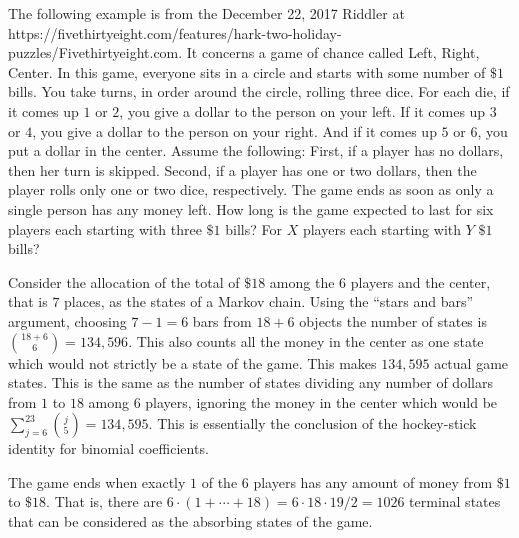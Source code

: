 \documentclass[12pt]{article}
\begin{document}
\begin{example}
    The following example is from the December 22, 2017 Riddler at \link
    {https://fivethirtyeight.com/features/hark-two-holiday-puzzles/}{Fivethirtyeight.com}.
    It concerns a game of chance called Left, Right, Center.  In this
    game, everyone sits in a circle and starts with some number of \( \$1
    \) bills.  You take turns, in order around the circle, rolling three
    dice.  For each die, if it comes up \( 1 \) or \( 2 \), you give a
    dollar to the person on your left.  If it comes up \( 3 \) or \( 4 \),
    you give a dollar to the person on your right.  And if it comes up \(
    5 \) or \( 6 \), you put a dollar in the center.  Assume the
    following:  First, if a player has no dollars, then her turn is
    skipped.  Second, if a player has one or two dollars, then the
    player rolls only one or two dice, respectively.  The game ends as
    soon as only a single person has any money left.  How long is the
    game expected to last for six players each starting with three \( \$1
    \) bills?  For \( X \) players each starting with \( Y \) \( \$1 \)
    bills?

    Consider the allocation of the total of \( \$18 \) among the \( 6 \)
    players and the center, that is \( 7 \) places, as the states of a
    Markov chain.  Using the ``stars and bars'' argument, choosing \(
    7-1 = 6 \) bars from \( 18 + 6 \) objects the number of states is \(
    \binom{18+6}{6} = 134{,}596 \).  This also counts all the money in
    the center as one state which would not strictly be a state of the
    game.  This makes \( 134{,}595 \) actual game states.  This is the
    same as the number of states dividing any number of dollars from \(
    1 \) to \( 18 \) among \( 6 \) players, ignoring the money in the
    center which would be \( \sum_{j=6}^{23}\binom{j}{5} = 134{,}595 \).
    This is essentially the conclusion of the hockey-stick identity for
    binomial coefficients.

    The game ends when exactly \( 1 \) of the \( 6 \) players has any
    amount of money from \( \$1 \) to \( \$18 \).  That is, there are \(
    6 \cdot (1 + \cdots + 18) = 6 \cdot 18 \cdot 19/2 = 1026 \) terminal
    states that can be considered as the absorbing states of the game.


\end{example}
\end{document}
